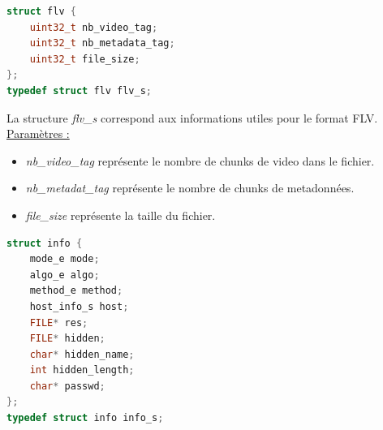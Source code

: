 \documentclass[11pt]{article}
\begin{document}
\begin{lstlisting}[language=c]
struct flv {
	uint32_t nb_video_tag;
	uint32_t nb_metadata_tag;
	uint32_t file_size;
};
typedef struct flv flv_s;
\end{lstlisting}

La structure \textit{flv\_s} correspond aux informations 
utiles pour le format FLV.  
\newline
\underline{Paramètres :}
\begin{itemize}
\item \textit{nb\_video\_tag} représente le nombre de chunks de video dans 
le fichier. 
\item \textit{nb\_metadat\_tag} représente le nombre de chunks de metadonnées. 
\item \textit{file\_size} représente la taille du fichier. 
\newline
\end{itemize}

\begin{lstlisting}[language=c]
struct info {
    mode_e mode;  
    algo_e algo; 
    method_e method;            
    host_info_s host;           
    FILE* res;                 
    FILE* hidden;              
    char* hidden_name;
    int hidden_length; 
    char* passwd;
};
typedef struct info info_s;
\end{lstlisting}
\end{document}
